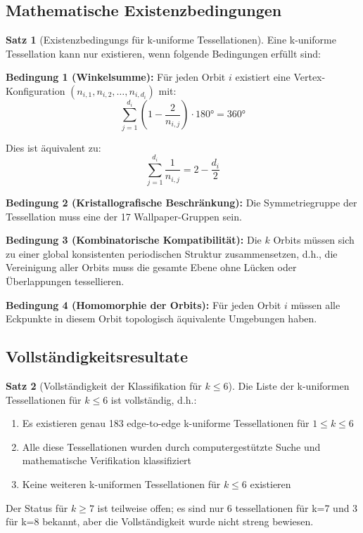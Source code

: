 \documentclass[a4paper,12pt]{article}
\theoremstyle{definition}
\newtheorem{satz}{Satz}[section]
\begin{document}
\subsection{Mathematische Existenzbedingungen}

\begin{satz}[Existenzbedingungs für k-uniforme Tessellationen]
	Eine k-uniforme Tessellation kann nur existieren, wenn folgende Bedingungen erfüllt sind:
	
	\textbf{Bedingung 1 (Winkelsumme):} Für jeden Orbit $i$ existiert eine Vertex-Konfiguration $(n_{i,1}, n_{i,2}, \ldots, n_{i,d_i})$ mit:
	\[
	\sum_{j=1}^{d_i} \left( 1 - \frac{2}{n_{i,j}} \right) \cdot 180° = 360°
	\]
	
	Dies ist äquivalent zu:
	\[
	\sum_{j=1}^{d_i} \frac{1}{n_{i,j}} = 2 - \frac{d_i}{2}
	\]
	
	\textbf{Bedingung 2 (Kristallografische Beschränkung):} Die Symmetriegruppe der Tessellation muss eine der 17 Wallpaper-Gruppen sein.
	
	\textbf{Bedingung 3 (Kombinatorische Kompatibilität):} Die $k$ Orbits müssen sich zu einer global konsistenten periodischen Struktur zusammensetzen, d.h., die Vereinigung aller Orbits muss die gesamte Ebene ohne Lücken oder Überlappungen tessellieren.
	
	\textbf{Bedingung 4 (Homomorphie der Orbits):} Für jeden Orbit $i$ müssen alle Eckpunkte in diesem Orbit topologisch äquivalente Umgebungen haben.
\end{satz}

\subsection{Vollständigkeitsresultate}

\begin{satz}[Vollständigkeit der Klassifikation für $k \leq 6$]
	Die Liste der k-uniformen Tessellationen für $k \leq 6$ ist vollständig, d.h.:
	
	\begin{enumerate}
		\item Es existieren genau 183 edge-to-edge k-uniforme Tessellationen für $1 \leq k \leq 6$
		\item Alle diese Tessellationen wurden durch computergestützte Suche und mathematische Verifikation klassifiziert
		\item Keine weiteren k-uniformen Tessellationen für $k \leq 6$ existieren
	\end{enumerate}
	
	Der Status für $k \geq 7$ ist teilweise offen; es sind nur 6 tessellationen für k=7 und 3 für k=8 bekannt, aber die Vollständigkeit wurde nicht streng bewiesen.
\end{satz}
\end{document}

